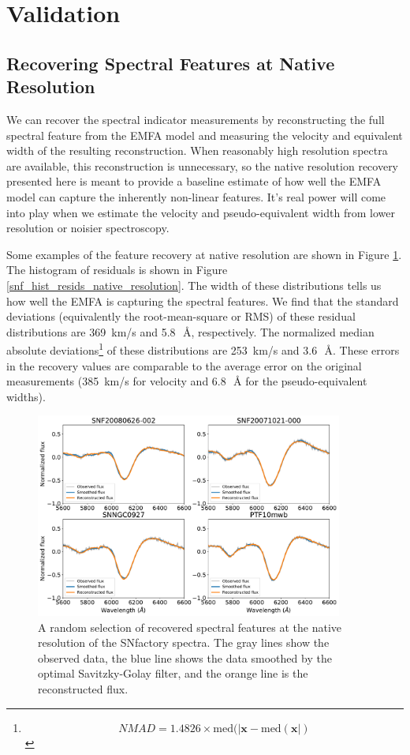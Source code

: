 \section{Validation}
\label{validation}

\subsection{Recovering Spectral Features at Native Resolution}
\label{snf_validation}
We can recover the spectral indicator measurements by reconstructing the full spectral feature from the EMFA model and measuring the velocity and equivalent width of the resulting reconstruction. When reasonably high resolution spectra are available, this reconstruction is unnecessary, so the native resolution recovery presented here is meant to provide a baseline estimate of how well the EMFA model can capture the inherently non-linear \siliconii{} features. It's real power will come into play when we estimate the velocity and pseudo-equivalent width from lower resolution or noisier spectroscopy.

Some examples of the feature recovery at native resolution are shown in Figure \ref{feature_recovery}. The histogram of residuals is shown in Figure \ref{snf_hist_resids_native_resolution}. The width of these distributions tells us how well the EMFA is capturing the spectral features. We find that the standard deviations (equivalently the root-mean-square or RMS) of these residual distributions are 369~km/s and 5.8~\,\AA{}, respectively. The normalized median absolute deviations\footnote{$$NMAD=1.4826\times\textrm{med}(|\bm{x}-\textrm{med}(\bm{x}|)$$} of these distributions are 253~km/s and 3.6~\,\AA{}. These errors in the recovery values are comparable to the average error on the original measurements (385~km/s for velocity and 6.8~\,\AA{} for the pseudo-equivalent widths).

\begin{figure}[htbp]
    \centering
    \includegraphics[width=0.9\textwidth]{figures/si_feat_pca/example_reconstruction.pdf}
    \caption{A random selection of recovered spectral features at the native resolution of the SNfactory spectra. The gray lines show the observed data, the blue line shows the data smoothed by the optimal Savitzky-Golay filter, and the orange line is the reconstructed flux.}
    \label{feature_recovery}
\end{figure}

